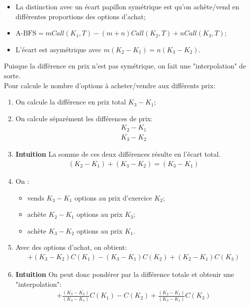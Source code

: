 \documentclass[10pt, french]{article}
\begin{document}
\begin{multicols*}{2}
\begin{definitionNOHFILL}
\begin{itemize}[leftmargin = *]
	\item	La distinction avec un écart papillon symétrique est qu'on achète/vend en différentes proportions des options d'achat;
	\item	$\text{A-BFS} = mCall(K_1, T) - (m + n) Call(K_2, T) + n Call(K_3, T)$;
	\item	L'écart est asymétrique avec $m(K_{2} - K_{1}) = n(K_{3} - K_{2})$.
\end{itemize}

Puisque la différence en prix n'est pas symétrique, on fait une "interpolation" de sorte.\\

Pour calcule le nombre d'options à acheter/vendre aux différents prix:
\begin{enumerate}[leftmargin = *]
	\item	On calcule la différence en prix total $K_{3} - K_{1}$;
	\item	On calcule séparément les différences de prix:
		\begin{align*}
		K_{2} - K_{1}	\\
		K_{3} - K_{2}
		\end{align*}
	\item[]\textbf{Intuition}	La somme de ces deux différences résulte en l'écart total.
		\begin{align*}
		(K_{2} - K_{1}) +  (K_{3} - K_{2}) = (K_{3} - K_{1})
		\end{align*}
	\item	On :
		\begin{itemize}[leftmargin = *]
		\item	vends $K_{3} - K_{1}$ options au prix d'exercice $K_{2}$;
		\item	achète $K_{2} - K_{1}$ options au prix $K_{3}$;
		\item	achète $K_{3} - K_{2}$ options au prix $K_{1}$.
		\end{itemize}
	\item	Avec des options d'achat, on obtient:
		\begin{align*}
		 + (K_{3} - K_{2}) C(K_{1}) - (K_{3} - K_{1}) C(K_{2}) + (K_{2} - K_{1}) C(K_{3}) 
		\end{align*}
	\item[]\textbf{Intuition}	On peut donc pondérer par la différence totale et obtenir une "interpolation":
		\begin{align*}
		 + \frac{(K_{3} - K_{2})}{(K_{3} - K_{1})} C(K_{1}) - C(K_{2}) + \frac{(K_{2} - K_{1})}{(K_{3} - K_{1})} C(K_{3}) 
		\end{align*}
\end{enumerate}


\end{definitionNOHFILL}
\end{multicols*}
\end{document}
